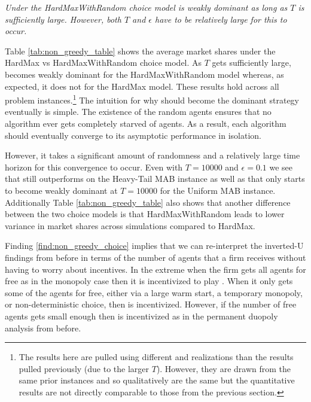 \documentclass[../competing_bandits.tex]{subfiles}
\begin{document}
\normalsize


\begin{finding}\label{find:non_greedy_choice}
\textit{Under the HardMaxWithRandom choice model \TS is weakly dominant as long as $T$ is sufficiently large. However, both $T$ and $\epsilon$ have to be relatively large for this to occur.}
\end{finding}


Table \ref{tab:non_greedy_table} shows the average market shares under the HardMax vs HardMaxWithRandom choice model. As $T$ gets sufficiently large, \TS becomes weakly dominant for the HardMaxWithRandom model whereas, as expected, it does not for the HardMax model. These results hold across all problem instances.\footnote{The results here are pulled using different \MRV and realizations than the results pulled previously (due to the larger $T$). However, they are drawn from the same prior instances and so qualitatively are the same but the quantitative results are not directly comparable to those from the previous section.} The intuition for why \TS should become the dominant strategy eventually is simple. The existence of the random agents ensures that no algorithm ever gets completely starved of agents. As a result, each algorithm should eventually converge to its asymptotic performance in isolation.

However, it takes a significant amount of randomness and a relatively large time horizon for this convergence to occur. Even with $T = 10000$ and $\epsilon = 0.1$ we see that \DEG still outperforms \DG on the Heavy-Tail MAB instance as well as that \TS only starts to become weakly dominant at $T = 10000$ for the Uniform MAB instance. Additionally Table \ref{tab:non_greedy_table} also shows that another difference between the two choice models is that HardMaxWithRandom leads to lower variance in market shares across simulations compared to HardMax.

Finding \ref{find:non_greedy_choice} implies that we can re-interpret the inverted-U findings from before in terms of the number of agents that a firm receives without having to worry about incentives. In the extreme when the firm gets all agents for free as in the monopoly case then it is incentivized to play \DG. When it only gets some of the agents for free, either via a large warm start, a temporary monopoly, or non-deterministic choice, then \TS is incentivized. However, if the number of free agents gets small enough then \DG is incentivized as in the permanent duopoly analysis from before.
\end{document}
